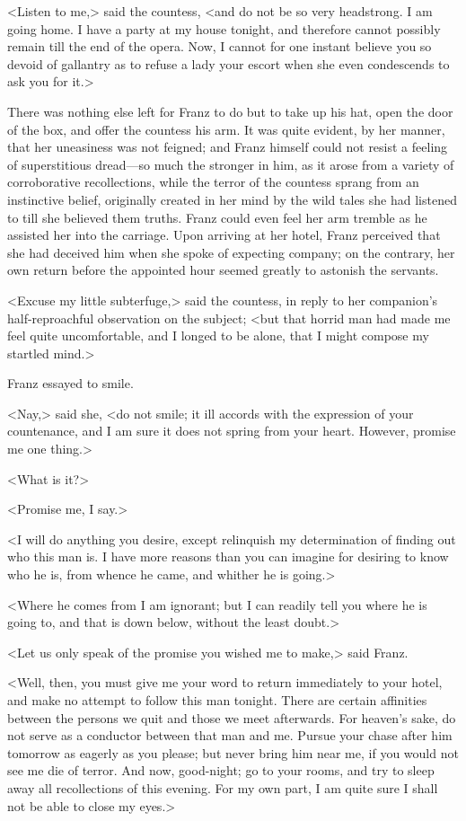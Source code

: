  <Listen to me,> said the countess, <and do not be so very headstrong. I am going home. I have a party at my house tonight, and therefore cannot possibly remain till the end of the opera. Now, I cannot for one instant believe you so devoid of gallantry as to refuse a lady your escort when she even condescends to ask you for it.> 

 There was nothing else left for Franz to do but to take up his hat, open the door of the box, and offer the countess his arm. It was quite evident, by her manner, that her uneasiness was not feigned; and Franz himself could not resist a feeling of superstitious dread—so much the stronger in him, as it arose from a variety of corroborative recollections, while the terror of the countess sprang from an instinctive belief, originally created in her mind by the wild tales she had listened to till she believed them truths. Franz could even feel her arm tremble as he assisted her into the carriage. Upon arriving at her hotel, Franz perceived that she had deceived him when she spoke of expecting company; on the contrary, her own return before the appointed hour seemed greatly to astonish the servants. 

 <Excuse my little subterfuge,> said the countess, in reply to her companion's half-reproachful observation on the subject; <but that horrid man had made me feel quite uncomfortable, and I longed to be alone, that I might compose my startled mind.> 

 Franz essayed to smile. 

 <Nay,> said she, <do not smile; it ill accords with the expression of your countenance, and I am sure it does not spring from your heart. However, promise me one thing.> 

 <What is it?> 

 <Promise me, I say.> 

 <I will do anything you desire, except relinquish my determination of finding out who this man is. I have more reasons than you can imagine for desiring to know who he is, from whence he came, and whither he is going.> 

 <Where he comes from I am ignorant; but I can readily tell you where he is going to, and that is down below, without the least doubt.> 

 <Let us only speak of the promise you wished me to make,> said Franz. 

 <Well, then, you must give me your word to return immediately to your hotel, and make no attempt to follow this man tonight. There are certain affinities between the persons we quit and those we meet afterwards. For heaven's sake, do not serve as a conductor between that man and me. Pursue your chase after him tomorrow as eagerly as you please; but never bring him near me, if you would not see me die of terror. And now, good-night; go to your rooms, and try to sleep away all recollections of this evening. For my own part, I am quite sure I shall not be able to close my eyes.> 

